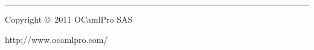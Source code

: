 \documentclass[10pt,landscape]{article}
\begin{document}
\begin{multicols}{3}
\rule{0.3\linewidth}{0.25pt}
\scriptsize

Copyright \copyright\ 2011 OCamlPro SAS

http://www.ocamlpro.com/


\end{multicols}
\end{document}
